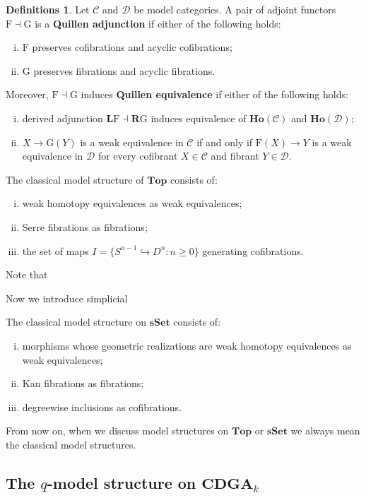 \documentclass[psamsfonts]{amsart}
\theoremstyle{definition}
\newtheorem{defns}[thm]{Definitions}
\theoremstyle{remark}
\newcommand{\CDGA}{\mathbf{CDGA}}
\newcommand{\Ho}{\mathbf{Ho}}
\newcommand{\Top}{\mathbf{Top}}
\newcommand{\sSet}{\mathbf{sSet}}
\numberwithin{equation}{section}
\begin{document}
\begin{defns}
Let $\mathcal{C}$ and $\mathcal{D}$ be model categories. A pair of adjoint functors $\mathrm{F}\dashv\mathrm{G}$ is a \textbf{Quillen adjunction} if either of the following holds:\begin{enumerate}[(i)]
    \item $\mathrm{F}$ preserves cofibrations and acyclic cofibrations;
    \item $\mathrm{G}$ preserves fibrations and acyclic fibrations.
\end{enumerate}
Moreover, $\mathrm{F}\dashv\mathrm{G}$ induces \textbf{Quillen equivalence} if either of the following holds:
\begin{enumerate}[(i)]
    \item derived adjunction $\mathbf{L}\mathrm{F}\dashv\mathbf{R}\mathrm{G}$ induces equivalence of $\Ho(\mathcal{C})$ and $\Ho(\mathcal{D})$;
    \item $X\to\mathrm{G}(Y)$ is a weak equivalence in $\mathcal{C}$ if and only if $\mathrm{F}(X)\to Y$ is a weak equivalence in $\mathcal{D}$ for every cofibrant $X\in\mathcal{C}$ and fibrant $Y\in\mathcal{D}$.
\end{enumerate}
\end{defns}

The classical model structure of $\Top$ consists of:\begin{enumerate}[(i)]
    \item weak homotopy equivalences as weak equivalences;
    \item Serre fibrations as fibrations;
    \item the set of maps $I=\{S^{n-1}\hookrightarrow D^n:n\geq0\}$ generating cofibrations.
\end{enumerate}
Note that\medbreak

Now we introduce simplicial

The classical model structure on $\sSet$ consists of:\begin{enumerate}[(i)]
    \item morphisms whose geometric realizations are weak homotopy equivalences as weak equivalences;
    \item Kan fibrations as fibrations;
    \item degreewise inclusions as cofibrations.
\end{enumerate}
From now on, when we discuss model structures on $\Top$ or $\sSet$ we always mean the classical model structures.

\subsection{The $q$-model structure on $\CDGA_k$}
\end{document}
